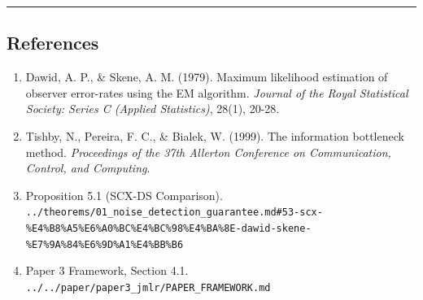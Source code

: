 \documentclass[
  12pt,
]{ctexart}
\begin{document}
\begin{center}\rule{0.5\linewidth}{0.5pt}\end{center}

\subsection{References}\label{references}

\begin{enumerate}
\def\labelenumi{\arabic{enumi}.}
\item
  Dawid, A. P., \& Skene, A. M. (1979). Maximum likelihood estimation of
  observer error-rates using the EM algorithm. \emph{Journal of the
  Royal Statistical Society: Series C (Applied Statistics)}, 28(1),
  20-28.
\item
  Tishby, N., Pereira, F. C., \& Bialek, W. (1999). The information
  bottleneck method. \emph{Proceedings of the 37th Allerton Conference
  on Communication, Control, and Computing}.
\item
  Proposition 5.1 (SCX-DS Comparison).
  \texttt{../theorems/01\_noise\_detection\_guarantee.md\#53-scx-\%E4\%B8\%A5\%E6\%A0\%BC\%E4\%BC\%98\%E4\%BA\%8E-dawid-skene-\%E7\%9A\%84\%E6\%9D\%A1\%E4\%BB\%B6}
\item
  Paper 3 Framework, Section 4.1.
  \texttt{../../paper/paper3\_jmlr/PAPER\_FRAMEWORK.md}
\end{enumerate}
\end{document}
